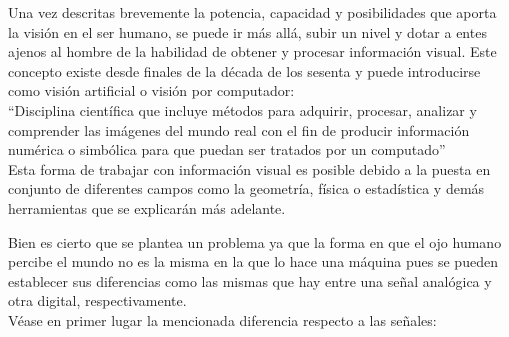 Una vez descritas brevemente la potencia, capacidad y posibilidades que aporta la visión en el ser humano, se puede ir más allá, subir un nivel y dotar a entes ajenos al hombre de la habilidad de obtener y procesar información visual. Este concepto existe desde finales de la década de los sesenta y puede introducirse como visión artificial o visión por computador\cite{vision_artificial}:
\\
``Disciplina científica que incluye métodos para adquirir, procesar, analizar y comprender las imágenes del mundo real con el fin de producir información numérica o simbólica para que puedan ser tratados por un computado''
\\
Esta forma de trabajar con información visual es posible debido a la puesta en conjunto de diferentes campos como la geometría, física o estadística y demás herramientas que se explicarán más adelante.

Bien es cierto que se plantea un problema ya que la forma en que el ojo humano percibe el mundo no es la misma en la que lo hace una máquina pues se pueden establecer sus diferencias como las mismas que hay entre una señal analógica y otra digital, respectivamente.
\\
Véase en primer lugar la mencionada diferencia respecto a las señales:

